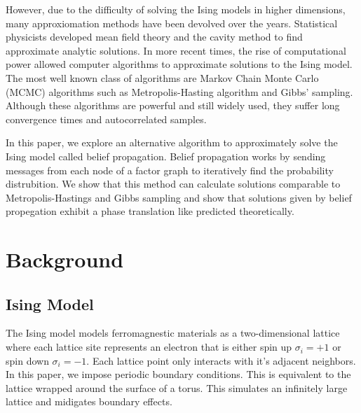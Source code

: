 \documentclass{article}
\begin{document}
    However, due to the difficulty of solving the Ising models in higher dimensions, many approxiomation methods have been devolved over the years. 
    Statistical physicists developed mean field theory and the cavity method to find approximate analytic solutions. In more recent times, the rise of computational 
    power allowed computer algorithms to approximate solutions to the Ising model. The most well known class of algorithms are Markov Chain Monte Carlo (MCMC) algorithms such as 
    Metropolis-Hasting algorithm and Gibbs' sampling. Although these algorithms are powerful and still widely used, they suffer long convergence times and autocorrelated samples.
    
    In this paper, we explore an alternative algorithm to approximately solve the Ising model called belief propagation. Belief propagation works by sending messages 
    from each node of a factor graph to iteratively find the probability distrubition. We show that this method can calculate solutions comparable to Metropolis-Hastings and Gibbs sampling 
    and show that solutions given by belief propegation exhibit a phase translation like predicted theoretically. 


\section{Background}
\label{Mathematical Background}
    \subsection{Ising Model}
    The Ising model models ferromagnestic materials as a two-dimensional lattice where each lattice site represents an 
    electron that is either spin up $\sigma_i = +1$ or spin down $\sigma_i = -1$. Each lattice point only interacts
    with it's adjacent neighbors. In this paper, we impose periodic boundary conditions. This is equivalent to the lattice wrapped around the surface of a torus. This simulates 
    an infinitely large lattice and midigates boundary effects. 
    
\end{document}
